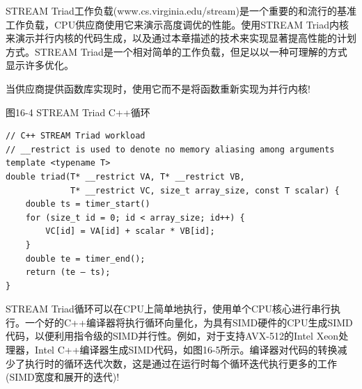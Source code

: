 \begin{tcolorbox}[colback=blue!5!white,colframe=blue!75!black, title=关于STREAM Triad工作负载的解释]
STREAM Triad工作负载(www.cs.virginia.edu/stream)是一个重要的和流行的基准工作负载，CPU供应商使用它来演示高度调优的性能。使用STREAM Triad内核来演示并行内核的代码生成，以及通过本章描述的技术来实现显著提高性能的计划方式。STREAM Triad是一个相对简单的工作负载，但足以以一种可理解的方式显示许多优化。
\end{tcolorbox}

\begin{tcolorbox}[colback=blue!5!white,colframe=blue!75!black, title=使用供应商提供的库!]
当供应商提供函数库实现时，使用它而不是将函数重新实现为并行内核!
\end{tcolorbox}

\hspace*{\fill} \par %
图16-4 STREAM Triad C++循环
\begin{lstlisting}[caption={}]
// C++ STREAM Triad workload
// __restrict is used to denote no memory aliasing among arguments 
template <typename T>
double triad(T* __restrict VA, T* __restrict VB, 
			 T* __restrict VC, size_t array_size, const T scalar) {
	double ts = timer_start()
	for (size_t id = 0; id < array_size; id++) {
		VC[id] = VA[id] + scalar * VB[id];
	}
	double te = timer_end();
	return (te – ts); 
}
\end{lstlisting}

STREAM Triad循环可以在CPU上简单地执行，使用单个CPU核心进行串行执行。一个好的C++编译器将执行循环向量化，为具有SIMD硬件的CPU生成SIMD代码，以便利用指令级的SIMD并行性。例如，对于支持AVX-512的Intel Xeon处理器，Intel C++编译器生成SIMD代码，如图16-5所示。编译器对代码的转换减少了执行时的循环迭代次数，这是通过在运行时每个循环迭代执行更多的工作(SIMD宽度和展开的迭代)!\par

